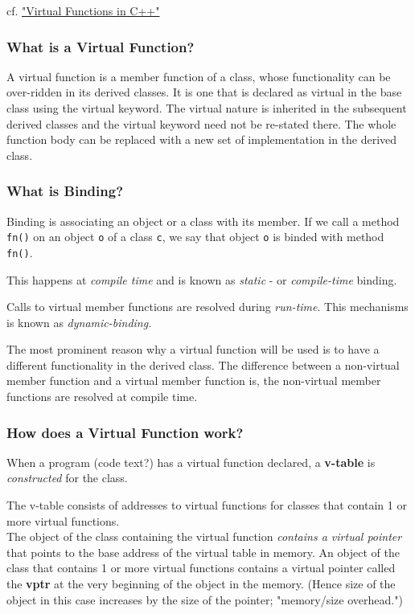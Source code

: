 \documentclass[10pt]{amsart}
\begin{document}
\begin{multicols*}{2}
cf. \href{http://wayback.archive.org/web/20100209040010/http://www.codersource.net/published/view/325/virtual_functions_in.aspx}{"Virtual Functions in C++"}

\subsubsection{What is a Virtual Function?}  

A virtual function is a member function of a class, whose functionality can be over-ridden in its derived classes. It is one that is declared as virtual in the base class using the virtual keyword. The virtual nature is inherited in the subsequent derived classes and the virtual keyword need not be re-stated there. The whole function body can be replaced with a new set of implementation in the derived class. 

\subsubsection{What is Binding?}  

Binding is associating an object or a class with its member.   If we call a method \verb|fn()| on an object \verb|o| of a class \verb|c|, we say that object \verb|o| is binded with method \verb|fn()|.  

This happens at \emph{compile time} and is known as \emph{static} - or \emph{compile-time} binding.   

Calls to virtual member functions are resolved during \emph{run-time}.  This mechanisms is known as \emph{dynamic-binding.}   

The most prominent reason why a virtual function will be used is to have a different functionality in the derived class.  The difference between a non-virtual member function and a virtual member function is, the non-virtual member functions are resolved at compile time.  

\subsubsection{How does a Virtual Function work?}  

When a program (code text?) has a virtual function declared, a \textbf{v-table} is \emph{constructed} for the class.  

The v-table consists of addresses to virtual functions for classes that contain 1 or more virtual functions.  \\
The object of the class containing the virtual function \emph{contains a virtual pointer} that points to the base address of the virtual table in memory.  An object of the class that contains 1 or more virtual functions contains a virtual pointer called the \textbf{vptr} at the very beginning of the object in the memory.  (Hence size of the object in this case increases by the size of the pointer; "memory/size overhead.")  \\


\end{multicols*}
\end{document}

